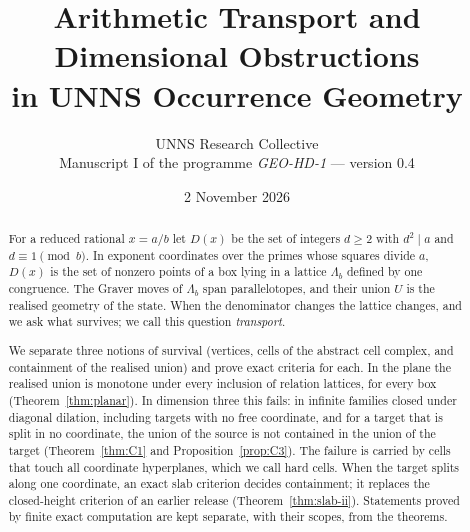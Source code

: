 \documentclass[11pt]{article}
\title{Arithmetic Transport and Dimensional Obstructions\\ in UNNS Occurrence Geometry}
\author{UNNS Research Collective\\[2pt]\small Manuscript I of the programme \emph{GEO-HD-1} --- version 0.4}
\date{2 November 2026}
\theoremstyle{plain}
\theoremstyle{definition}
\theoremstyle{remark}
\begin{document}
\maketitle
\begin{abstract}
For a reduced rational $x=a/b$ let $D(x)$ be the set of integers $d\ge2$ with $d^2\mid a$ and $d\equiv1\pmod b$. In exponent coordinates over the primes whose squares divide $a$, $D(x)$ is the set of nonzero points of a box lying in a lattice $\Lambda_b$ defined by one congruence. The Graver moves of $\Lambda_b$ span parallelotopes, and their union $U$ is the realised geometry of the state. When the denominator changes the lattice changes, and we ask what survives; we call this question \emph{transport}.

We separate three notions of survival (vertices, cells of the abstract cell complex, and containment of the realised union) and prove exact criteria for each. In the plane the realised union is monotone under every inclusion of relation lattices, for every box (Theorem~\ref{thm:planar}). In dimension three this fails: in infinite families closed under diagonal dilation, including targets with no free coordinate, and for a target that is split in no coordinate, the union of the source is not contained in the union of the target (Theorem~\ref{thm:C1} and Proposition~\ref{prop:C3}). The failure is carried by cells that touch all coordinate hyperplanes, which we call hard cells. When the target splits along one coordinate, an exact slab criterion decides containment; it replaces the closed-height criterion of an earlier release (Theorem~\ref{thm:slab-ii}). Statements proved by finite exact computation are kept separate, with their scopes, from the theorems.
\end{abstract}
\tableofcontents












\appendix


\end{document}
